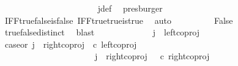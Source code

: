 \begin{isabellebody}
\ \ \ \ \ \ \isamarkupfalse%
\ \isamarkupfalse%
\ {\isachardoublequoteopen}{\isasymlangle}{\isasymt}{\isacharcomma}{\kern0pt}\ {\isasymt}{\isasymrangle}\ {\isacharequal}{\kern0pt}\ {\isasymlangle}{\isasymt}{\isacharcomma}{\kern0pt}{\isasymf}{\isasymrangle}{\isachardoublequoteclose}\isanewline
\ \ \ \ \ \ \ \ \isamarkupfalse%
\ j{\isacharunderscore}{\kern0pt}def\ \isamarkupfalse%
\ presburger\isanewline
\ \ \ \ \ \ \isamarkupfalse%
\ \isamarkupfalse%
\ {\isachardoublequoteopen}{\isasymt}\ {\isacharequal}{\kern0pt}\ {\isasymf}{\isachardoublequoteclose}\isanewline
\ \ \ \ \ \ \ \ \isamarkupfalse%
\ IFF{\isacharunderscore}{\kern0pt}true{\isacharunderscore}{\kern0pt}false{\isacharunderscore}{\kern0pt}is{\isacharunderscore}{\kern0pt}false\ IFF{\isacharunderscore}{\kern0pt}true{\isacharunderscore}{\kern0pt}true{\isacharunderscore}{\kern0pt}is{\isacharunderscore}{\kern0pt}true\ \isamarkupfalse%
\ auto\isanewline
\ \ \ \ \ \ \isamarkupfalse%
\ \isamarkupfalse%
\ False\isanewline
\ \ \ \ \ \ \ \ \isamarkupfalse%
\ true{\isacharunderscore}{\kern0pt}false{\isacharunderscore}{\kern0pt}distinct\ \isamarkupfalse%
\ blast\isanewline
\ \ \ \ \isamarkupfalse%
\isanewline
\ \ \isamarkupfalse%
\isanewline
\ \ \ \ \isamarkupfalse%
\ {\isachardoublequoteopen}j\ {\isasymnoteq}\ left{\isacharunderscore}{\kern0pt}coproj\ {\isasymone}\ {\isacharparenleft}{\kern0pt}{\isasymone}\ {\isasymCoprod}\ {\isasymone}{\isacharparenright}{\kern0pt}{\isachardoublequoteclose}\isanewline
\ \ \ \ \isamarkupfalse%
\ \isamarkupfalse%
\ case{}{\isacharunderscore}{\kern0pt}or{\isacharunderscore}{\kern0pt}{}{\isacharcolon}{\kern0pt}\ {\isachardoublequoteopen}j\ {\isacharequal}{\kern0pt}\ right{\isacharunderscore}{\kern0pt}coproj\ {\isasymone}\ {\isacharparenleft}{\kern0pt}{\isasymone}{\isasymCoprod}{\isasymone}{\isacharparenright}{\kern0pt}{\isasymcirc}\isactrlsub c\ left{\isacharunderscore}{\kern0pt}coproj\ {\isasymone}\ {\isasymone}\ {\isasymor}\ \isanewline
\ \ \ \ \ \ \ \ \ \ \ \ \ \ \ \ \ \ \ \ \ \ j\ {\isacharequal}{\kern0pt}\ right{\isacharunderscore}{\kern0pt}coproj\ {\isasymone}\ {\isacharparenleft}{\kern0pt}{\isasymone}{\isasymCoprod}{\isasymone}{\isacharparenright}{\kern0pt}\ {\isasymcirc}\isactrlsub c\ right{\isacharunderscore}{\kern0pt}coproj\ {\isasymone}\ {\isasymone}{\isachardoublequoteclose}\isanewline

\end{isabellebody}
